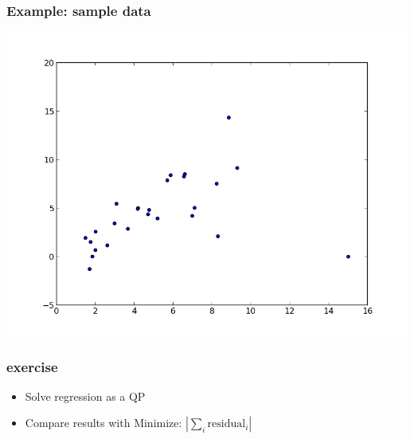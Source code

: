 \documentclass[12pt,handout]{beamer}
\begin{document}
\begin{frame}
\frametitle{Example: sample data}
\includegraphics[scale=0.5]{regression.png}
\end{frame}

\begin{frame}
  \frametitle{exercise}
  \begin{itemize}
  \item Solve regression as a QP
  \item Compare results with Minimize: $|\sum_i \mbox{residual}_i|$
  \end{itemize}
\end{frame}
\end{document}
